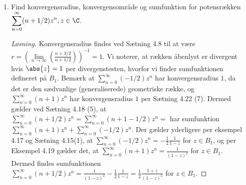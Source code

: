 \setcounter{section}{3}

\begin{opg}\hfill \\
	\begin{enumerate}
		\item Find konvergensradius, konvergensomr\aa{}de  og sumfunktion for potensr\ae{}kken $\displaystyle \sum_{n=0}^{\infty}(n+1/2)z^n ,  z\in\C $. %
			\ifanswers
			\begin{proof}[Løsning]
				Konvergensradius findes ved Sætning 4.8 til at være $ r=\left(\lim\limits_{n\to\infty}\left(\frac{n+3/2}{n+1/2}\right)\right)^{-1}=1 $. Vi noterer, at rækken åbenlyst er divergent hvis $ \abs{z}=1 $ per divergenstesten, hvorfor vi finder sumfunktionen defineret på $ B_1 $. Bemærk at $ \sum_{n=0}^{\infty}(-1/2)z^n $ har konvergensradius $ 1 $, da det er den sædvanlige (generaliserede) geometriske række, og $ \sum_{n=0}^{\infty}(n+1)z^n $ har konvergensradius $ 1 $ per Sætning 4.22 (7). Dermed gælder ved Sætning 4.18 (5), at $ \sum_{n=0}^{\infty}(n+1/2)z^n=\sum_{n=0}^{\infty}(n+1-1/2)z^n= $ har sumfunktion $ \sum_{n=0}^{\infty}(n+1)z^n+\sum_{n=0}^{\infty}(-1/2)z^n  $. Der gælder yderligere per eksempel 4.17 og Sætning 4.15(1), at $ \sum_{n=0}^{\infty}(-1/2)z^n=-\frac{1}{2}\frac{1}{1-z} $ for $z\in B_1 $, og per Eksempel 4.19 gælder det, at $ \sum_{n=0}^{\infty}(n+1)z^{n}=\frac{1}{(1-z)^2} $ for $ z\in B_1 $. Dermed findes sumfunktionen $ \sum_{n=0}^{\infty}(n+1/2)z^n =\frac{1}{(1-z)^2}-\frac{1}{2}\frac{1}{1-z}=\frac{1}{2}\frac{1+z}{(1-z)^2} $ for $ z\in B_1 $.	
				\end{proof}
			\fi


\end{enumerate}
\end{opg}
